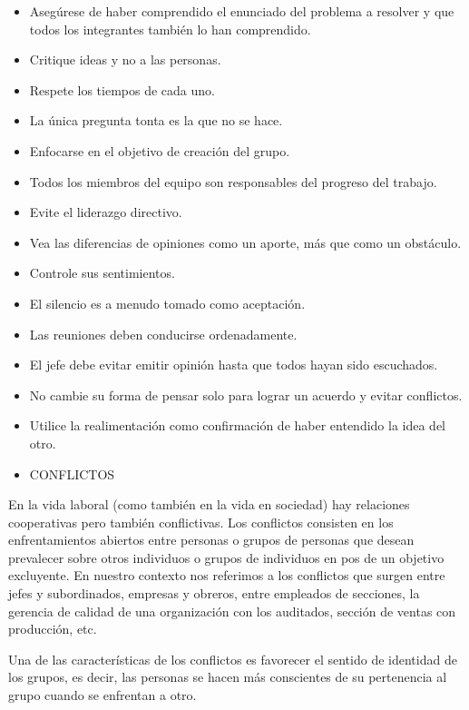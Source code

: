 \begin{itemize}
  \item Asegúrese de haber comprendido el enunciado del problema a resolver y que todos los integrantes también lo han comprendido.
  \item Critique ideas y no a las personas.
\end{itemize}


\begin{itemize}
  \item Respete los tiempos de cada uno.
  \item La única pregunta tonta es la que no se hace.
  \item Enfocarse en el objetivo de creación del grupo.
  \item Todos los miembros del equipo son responsables del progreso del trabajo.
  \item Evite el liderazgo directivo.
  \item Vea las diferencias de opiniones como un aporte, más que como un obstáculo.
  \item Controle sus sentimientos.
  \item El silencio es a menudo tomado como aceptación.
  \item Las reuniones deben conducirse ordenadamente.
  \item El jefe debe evitar emitir opinión hasta que todos hayan sido escuchados.
  \item No cambie su forma de pensar solo para lograr un acuerdo y evitar conflictos.
  \item Utilice la realimentación como confirmación de haber entendido la idea del otro.
  \item CONFLICTOS
\end{itemize}
En la vida laboral (como también en la vida en sociedad) hay relaciones cooperativas pero también conflictivas. Los conflictos consisten en los enfrentamientos abiertos entre personas o grupos de personas que desean prevalecer sobre otros individuos o grupos de individuos en pos de un objetivo excluyente. En nuestro contexto nos referimos a los conflictos que surgen entre jefes y subordinados, empresas y obreros, entre empleados de secciones, la gerencia de calidad de una organización con los auditados, sección de ventas con producción, etc.

Una de las características de los conflictos es favorecer el sentido de identidad de los grupos, es decir, las personas se hacen más conscientes de su pertenencia al grupo cuando se enfrentan a otro.

